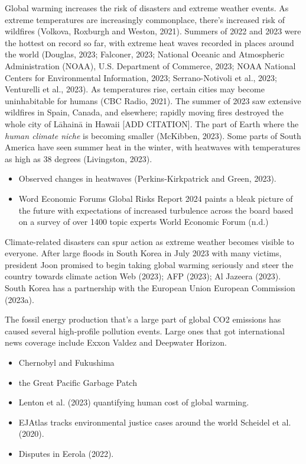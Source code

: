 \documentclass[
  letterpaper,
  DIV=11,
  numbers=noendperiod]{scrartcl}
\providecommand{\tightlist}{%
  \setlength{\itemsep}{0pt}\setlength{\parskip}{0pt}}\usepackage{longtable,booktabs,array}
\begin{document}
Global warming increases the risk of disasters and extreme weather
events. As extreme temperatures are increasingly commonplace, there's
increased risk of wildfires (Volkova, Roxburgh and Weston, 2021).
Summers of 2022 and 2023 were the hottest on record so far, with extreme
heat waves recorded in places around the world (Douglas, 2023; Falconer,
2023; National Oceanic and Atmospheric Administration (NOAA), U.S.
Department of Commerce, 2023; NOAA National Centers for Environmental
Information, 2023; Serrano-Notivoli et al., 2023; Venturelli et al.,
2023). As temperatures rise, certain cities may become uninhabitable for
humans (CBC Radio, 2021). The summer of 2023 saw extensive wildfires in
Spain, Canada, and elsewhere; rapidly moving fires destroyed the whole
city of Lāhainā in Hawaii {[}ADD CITATION{]}. The part of Earth where
the \emph{human climate niche} is becoming smaller (McKibben, 2023).
Some parts of South America have seen summer heat in the winter, with
heatwaves with temperatures as high as 38 degrees (Livingston, 2023).

\begin{itemize}
\tightlist
\item
  Observed changes in heatwaves (Perkins-Kirkpatrick and Green, 2023).
\item
  Word Economic Forums Global Risks Report 2024 paints a bleak picture
  of the future with expectations of increased turbulence across the
  board based on a survey of over 1400 topic experts World Economic
  Forum (n.d.)
\end{itemize}

Climate-related disasters can spur action as extreme weather becomes
visible to everyone. After large floods in South Korea in July 2023 with
many victims, president Joon promised to begin taking global warming
seriously and steer the country towards climate action Web (2023); AFP
(2023); Al Jazeera (2023). South Korea has a partnership with the
European Union European Commission (2023a).

The fossil energy production that's a large part of global CO2 emissions
has caused several high-profile pollution events. Large ones that got
international news coverage include Exxon Valdez and Deepwater Horizon.

\begin{itemize}
\tightlist
\item
  Chernobyl and Fukushima
\item
  the Great Pacific Garbage Patch
\item
  Lenton et al. (2023) quantifying human cost of global warming.
\item
  EJAtlas tracks environmental justice cases around the world Scheidel
  et al. (2020).
\item
  Disputes in Eerola (2022).
\end{itemize}
\end{document}
